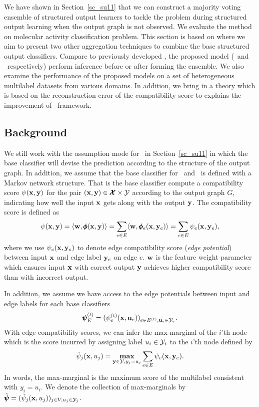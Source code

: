 {We have shown in Section~\ref{sc_su11} that we can construct a majority voting ensemble of structured output learners to tackle the problem during structured output learning when the output graph is not observed.
We evaluate the method on molecular activity classification problem.
This section is based on  where we aim to present two other aggregation techniques to combine the base structured output classifiers.
Compare to previously developed \mve, the proposed model (\amm\ and \mam\ respectively) perform inference before or after forming the ensemble.
We also examine the performance of the proposed models on a set of heterogeneous multilabel datasets from various domains.
In addition, we bring in a theory which is based on the reconstruction error of the compatibility score to explains the improvement of \mam\ framework.



%
%
\subsection{Background}

We still work with the assumption mode for \mve\ in Section~\ref{sc_su11} in which the base classifier will devise the prediction according to the structure of the output graph.
In addition, we assume that the base classifier for \amm\ and \mam\ is defined with a Markov network structure.
That is the base classifier compute a compatibility score $\psi(\mathbf {x},\mathbf {y})$ for the pair $(\mathbf {x},\mathbf {y})\in\pmb {\mathcal{X}}\times\mathcal{Y}$ according to the output graph $G$, indicating how well the input $\mathbf {x}$ gets along with the output $\mathbf {y}$.
The compatibility score is defined as
\begin{align*}
	\psi(\mathbf {x},\mathbf {y}) = \langle \mathbf {w}, \pmb \phi(\mathbf {x},\mathbf {y}) \rangle = \sum_{e\in E}\langle \mathbf {w}, \pmb \phi_e(\mathbf {x},\mathbf {y}_e) \rangle=\sum_{e\in E}\psi_e(\mathbf {x},\mathbf {y}_e),
\end{align*}
where we use $\psi_e(\mathbf {x},\mathbf {y}_e)$ to denote edge compatibility score (\textit{edge potential}) between input $\mathbf {x}$ and edge label $\mathbf {y}_e$ on edge $e$.
$\mathbf {w}$ is the feature weight parameter which ensures input $\mathbf {x}$ with correct output $\mathbf {y}$ achieves higher compatibility score than with incorrect output.

In addition, we assume we have access to the edge potentials between input and edge labels for each base classifiers
\begin{align*}
	\pmb \psi_E^{(t)} = (\psi_e^{(t)}(\mathbf {x},\mathbf {u}_e))_{e\in E^{(t)},\mathbf {u}_e\in\mathcal{Y}_e}.
\end{align*}
With edge compatibility scores, we can infer the max-marginal of the $i$'th node which is the score incurred by assigning label $u_i\in\mathcal{Y}_i$ to the $i$'th node \citep{Wainwright05map} defined by
\begin{align*}
	\tilde{\psi}_j(\mathbf {x},u_j) = \underset{\mathbf {y}\in\mathcal{Y},y_j=u_j}{\textbf{max}}\sum_{e\in E}\psi_e(\mathbf {x},\mathbf {y}_e).
\end{align*}
In words, the max-marginal is the maximum score of the multilabel consistent with $y_i=u_i$.
We denote the collection of max-marginals by $\tilde{\pmb \psi} = (\tilde{\psi}_j(\mathbf {x},u_j))_{j\in V,u_j\in\mathcal{Y}_j}$.

}
